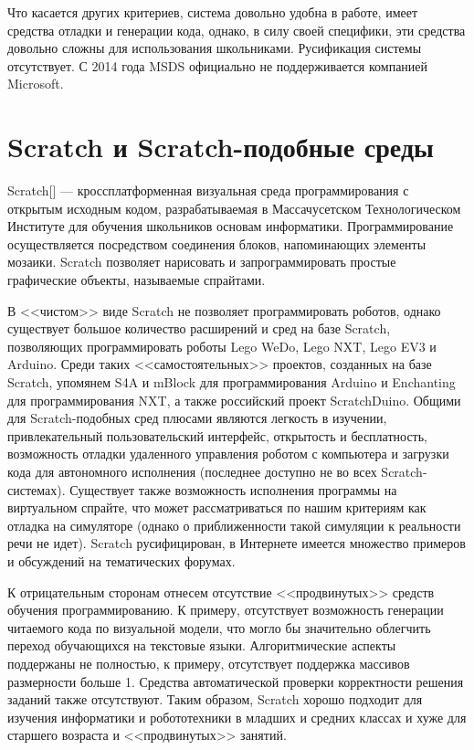 \documentclass[a5paper]{article}
\begin{document}
Что касается других критериев, система довольно удобна в работе, имеет средства отладки и генерации кода, однако, 
в силу своей специфики, эти средства довольно сложны для использования школьниками. Русификация системы отсутствует. 
С 2014 года MSDS официально не поддерживается компанией Microsoft.

\section{Scratch и Scratch-подобные среды}
Scratch[] --- кроссплатформенная визуальная среда программирования с открытым исходным кодом, разрабатываемая 
в Массачусетском Технологическом Институте для обучения школьников основам информатики. Программирование 
осуществляется посредством соединения блоков, напоминающих элементы мозаики. Scratch позволяет нарисовать 
и запрограммировать простые графические объекты, называемые спрайтами. 

В <<чистом>> виде Scratch не позволяет программировать роботов, однако существует большое количество расширений и 
сред на базе Scratch, позволяющих программировать роботы Lego WeDo, Lego NXT, Lego EV3 и Arduino.  Среди таких 
<<самостоятельных>> проектов, созданных на базе Scratch, упомянем S4A и mBlock для программирования Arduino и 
Enchanting для программирования NXT, а также российский проект ScratchDuino. Общими для Scratch-подобных 
сред плюсами являются легкость в изучении, привлекательный пользовательский интерфейс, открытость и бесплатность, 
возможность отладки удаленного управления роботом с компьютера и загрузки кода для автономного исполнения 
(последнее доступно не во всех Scratch-системах). Существует также возможность исполнения программы на виртуальном 
спрайте, что может рассматриваться по нашим критериям как отладка на симуляторе (однако о приближенности такой 
симуляции к реальности речи не идет). Scratch русифицирован, в Интернете имеется множество примеров 
и обсуждений на тематических форумах. 

К отрицательным сторонам отнесем отсутствие <<продвинутых>> средств обучения программированию. К примеру, 
отсутствует возможность генерации читаемого кода по визуальной модели, что могло бы значительно облегчить 
переход обучающихся на текстовые языки. Алгоритмические аспекты поддержаны не полностью, к примеру, 
отсутствует поддержка массивов размерности больше 1. Средства автоматической проверки корректности решения 
заданий также отсутствуют. Таким образом, Scratch хорошо подходит для изучения информатики и робототехники 
в младших и средних классах и хуже для старшего возраста и <<продвинутых>> занятий.
\end{document}
